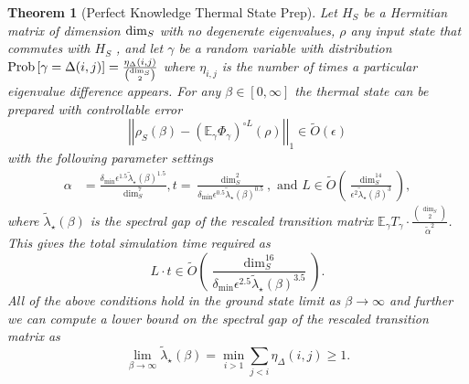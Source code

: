 \documentclass[
 amsmath,amssymb,
 aps,
onecolumn, 
nofootinbib]{revtex4-2}
\newtheorem{theorem}{Theorem}
\newcommand{\norm}[1]{\left|\left| #1 \right|\right|}
\newcommand{\EE}{\mathbb{E}}
\newcommand{\prob}[1]{{\rm Prob}\left[ #1 \right]}
\newcommand{\bigotilde}[1]{\widetilde{O} \left( #1 \right)}
\begin{document}
\begin{theorem}[Perfect Knowledge Thermal State Prep] \label{thm:perfect_knowledge}
    Let $H_S$ be a Hermitian matrix of dimension ${\rm dim}_S$ with no degenerate eigenvalues, $\rho$ any input state that commutes with $H_S$ , and let $\gamma$ be a random variable with distribution $\prob{\gamma = \Delta(i,j)} = \frac{\eta_\Delta(i,j)}{\binom{\dim_S}{2}}$ where $\eta_{i,j}$ is the number of times a particular eigenvalue difference appears. For any $\beta\in [0,\infty]$ the thermal state can be prepared with controllable error
    \begin{equation}
        \norm{\rho_S(\beta) - \left(\EE_\gamma \Phi_\gamma \right)^{\circ L}(\rho)}_1 \in \bigotilde{\epsilon}
    \end{equation}
     with the following parameter settings
     \begin{align}
         \alpha &= \frac{\delta_{\min} \epsilon^{1.5} \widetilde{\lambda}_\star(\beta)^{1.5}}{\dim_S^7}, t = \frac{\dim_S^2}{\delta_{\min} \epsilon^{0.5} \widetilde{\lambda}_\star(\beta)^{0.5}},\text{ and } L \in \bigotilde{\frac{\dim_S^{14}}{\epsilon^2 \widetilde{\lambda}_\star(\beta)^3}},
     \end{align}
     where $\widetilde{\lambda}_\star(\beta)$ is the spectral gap of the rescaled transition matrix $\EE_\gamma T_\gamma  \cdot \frac{\binom{\dim_S}{2}}{\widetilde{\alpha}^2}$. 
     This gives the total simulation time required as
     \begin{equation}
         L \cdot t \in \bigotilde{\frac{\dim_S^{16}}{\delta_{\min} \epsilon^{2.5} \widetilde{\lambda}_\star(\beta)^{3.5}}}.
     \end{equation}
     All of the above conditions hold in the ground state limit as $\beta \to \infty$ and further we can compute a lower bound on the spectral gap of the rescaled transition matrix as
     \begin{equation}
         \lim_{\beta \to \infty} \widetilde{\lambda}_\star(\beta) = \min_{i > 1} \sum_{j < i} \eta_\Delta(i,j) \ge 1.
     \end{equation}
\end{theorem}
\end{document}
